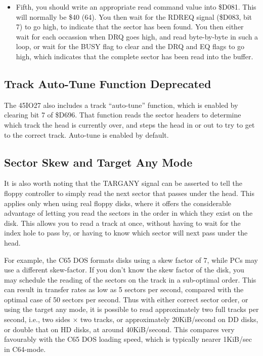 \begin{itemize}
\item Fifth, you should write an appropriate read command
value into \$D081.  This will normally be \$40 (64).  You then wait
for the RDREQ signal (\$D083, bit 7) to go high, to indicate that the
sector has been found. You then either wait for each occassion when
DRQ goes high, and read byte-by-byte in such a loop, or wait for the
BUSY flag to clear and the DRQ and EQ flags to go high, which indicates
that the complete sector has been read into the buffer.

\end{itemize}

\subsection{Track Auto-Tune Function Deprecated}

The 45IO27 also includes a track ``auto-tune'' function, which is enabled
by clearing bit 7 of \$D696.  That function reads the sector headers to
determine which track the head is currently over, and steps the head in or
out to try to get to the correct track. Auto-tune is enabled by default.

\subsection{Sector Skew and Target Any Mode}

It is also worth noting that the TARGANY signal can be asserted to
tell the floppy controller to simply read the next sector that passes
under the head.  This applies only when using real floppy disks, where
it offers the considerable advantage of letting you read the sectors
in the order in which they exist on the disk. This allows you to read
a track at once, without having to wait for the index hole to pass by,
or having to know which sector will next pass under the head.

For example,
the C65 DOS formats disks using a skew factor of 7, while PCs may use
a different skew-factor. If you don't know the skew factor of the disk,
you may schedule the reading of the sectors on the track in a sub-optimal
order. This can result in transfer rates as low as 5 sectors per second,
compared with the optimal case of 50 sectors per second.
Thus with either correct sector order, or using the target any mode,
it is possible to read approximately two full tracks per second,
i.e., two sides $\times$ two tracks, or approximately 20KiB/second on
DD disks, or double that on HD disks, at around 40KiB/second.  This
compares very favourably with the C65 DOS loading speed, which is
typically nearer 1KiB/sec in C64-mode.


